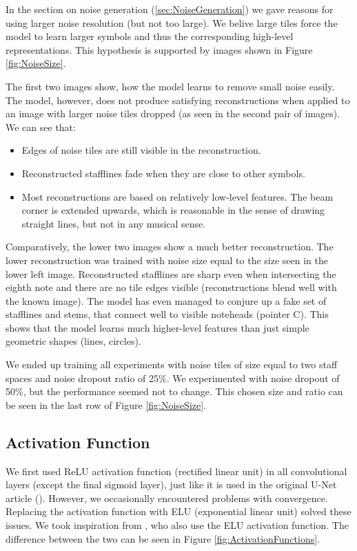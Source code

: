 In the section on noise generation (\ref{sec:NoiseGeneration}) we gave reasons for using larger noise resolution (but not too large). We belive large tiles force the model to learn larger symbols and thus the corresponding high-level representations. This hypothesis is supported by images shown in Figure \ref{fig:NoiseSize}.

The first two images show, how the model learns to remove small noise easily. The model, however, does not produce satisfying reconstructions when applied to an image with larger noise tiles dropped (as seen in the second pair of images). We can see that:

\begin{itemize}
    \item Edges of noise tiles are still visible in the reconstruction.
    \item Reconstructed stafflines fade when they are close to other symbols.
    \item Most reconstructions are based on relatively low-level features. The beam corner is extended upwards, which is reasonable in the sense of drawing straight lines, but not in any musical sense.
\end{itemize}

Comparatively, the lower two images show a much better reconstruction. The lower reconstruction was trained with noise size equal to the size seen in the lower left image. Reconstructed stafflines are sharp even when intersecting the eighth note and there are no tile edges visible (reconstructions blend well with the known image). The model has even managed to conjure up a fake set of stafflines and stems, that connect well to visible noteheads (pointer C). This shows that the model learns much higher-level features than just simple geometric shapes (lines, circles).

We ended up training all experiments with noise tiles of size equal to two staff spaces and noise dropout ratio of 25\%. We experimented with noise dropout of 50\%, but the performance seemed not to change. This chosen size and ratio can be seen in the last row of Figure \ref{fig:NoiseSize}.


\subsection{Activation Function}
\label{sec:ActivationFunction}

We first used ReLU activation function (rectified linear unit) in all convolutional layers (except the final sigmoid layer), just like it is used in the original U-Net article (\cite{UNet}). However, we occasionally encountered problems with convergence. Replacing the activation function with ELU (exponential linear unit) solved these issues. We took inspiration from \cite{DorferEtAl}, who also use the ELU activation function. The difference between the two can be seen in Figure \ref{fig:ActivationFunctions}.

